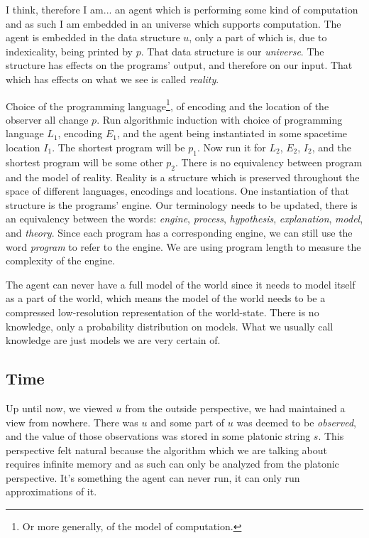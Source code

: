 \documentclass[oneside,hidelinks]{article}
\begin{document}
I think, therefore I am...  an agent which is performing some kind of computation and as such I am embedded in an universe which supports computation.
The agent is embedded in the data structure $u$, only a part of which is, due to indexicality, being printed by $p$.
That data structure is our \textit{universe}.
The structure has effects on the programs' output, and therefore on our input.
That which has effects on what we see is called \textit{reality}.

Choice of the programming language\footnote{Or more generally, of the model of computation.}, of encoding and the location of the observer all change $p$.
Run algorithmic induction with choice of programming language $L_1$, encoding $E_1$, and the agent being instantiated in some spacetime location $I_1$.
The shortest program will be $p_1$.
Now run it for $L_2$, $E_2$, $I_2$, and the shortest program will be some other $p_2$.
There is no equivalency between program and the model of reality.
Reality is a structure which is preserved throughout the space of different languages, encodings and locations.
One instantiation of that structure is the programs' engine.
Our terminology needs to be updated, there is an equivalency between the words: \textit{engine}, \textit{process}, \textit{hypothesis}, \textit{explanation}, \textit{model}, and \textit{theory}.
Since each program has a corresponding engine, we can still use the word \textit{program} to refer to the engine.
We are using program length to measure the complexity of the engine.

The agent can never have a full model of the world since it needs to model itself as a part of the world, which means the model of the world needs to be a compressed low-resolution representation of the world-state.
There is no knowledge, only a probability distribution on models.
What we usually call knowledge are just models we are very certain of.

\newpage

\subsection{Time}

Up until now, we viewed $u$ from the outside perspective, we had maintained a view from nowhere.
There was $u$ and some part of $u$ was deemed to be \textit{observed}, and the value of those observations was stored in some platonic string $s$.
This perspective felt natural because the algorithm which we are talking about requires infinite memory and as such can only be analyzed from the platonic perspective.
It's something the agent can never run, it can only run approximations of it.
\end{document}

